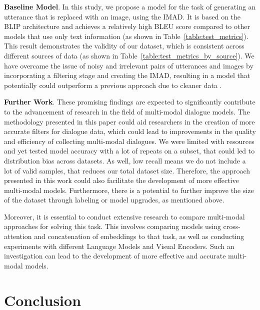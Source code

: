 \documentclass[11pt]{article}
\begin{document}
\smallskip

\textbf{Baseline Model}. In this study, we propose a model for the task of generating an utterance that is replaced with an image, using the IMAD. It is based on the BLIP architecture and achieves a relatively high BLEU score compared to other models that use only text information (as shown in Table~\ref{table:test_metrics}). This result demonstrates the validity of our dataset, which is consistent across different sources of data (as shown in Table~\ref{table:test_metrics_by_source}). We have overcame the issue of noisy and irrelevant pairs of utterances and images by incorporating a filtering stage and creating the IMAD, resulting in a model that potentially could outperform a previous approach due to cleaner data \cite{mm_chat}.

\smallskip

\textbf{Further Work}. These promising findings are expected to significantly contribute to the advancement of research in the field of multi-modal dialogue models. The methodology presented in this paper could aid researchers in the creation of more accurate filters for dialogue data, which could lead to improvements in the quality and efficiency of collecting multi-modal dialogues. We were limited with resources and yet tested model accuracy with a lot of repeats on a subset, that could led to distribution bias across datasets. As well, low recall means we do not include a lot of valid samples, that reduces our total dataset size. Therefore, the approach presented in this work could also facilitate the development of more effective multi-modal models. Furthermore, there is a potential to further improve the size of the dataset through labeling or model upgrades, as mentioned above.

\smallskip

Moreover, it is essential to conduct extensive research to compare multi-modal approaches for solving this task. This involves comparing models using cross-attention and concatenation of embeddings to that task, as well as conducting experiments with different Language Models and Visual Encoders. Such an investigation can lead to the development of more effective and accurate multi-modal models.


\section{Conclusion}
\end{document}
